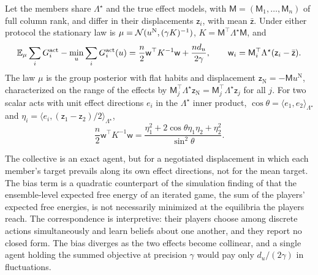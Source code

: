 \begin{proposition}\label{prop:obj-cost}
Let the members share $\Lambda^\star$ and the true effect models, with $\mathsf M=(\mathsf M_1,\dots,\mathsf M_n)$ of full column rank, and differ in their displacements $\mathsf z_i$, with mean $\bar{\mathsf z}$. Under either protocol the stationary law is $\mu=\mathcal{N}(u^{\mathrm N},(\gamma K)^{-1})$, $K=\mathsf M^\top\Lambda^\star\mathsf M$, and
\begin{equation}\label{eq:obj-cost}
\mathbb{E}_\mu\sum_iG^{\mathrm{act}}_i-\min_u\sum_iG^{\mathrm{act}}_i(u)=\frac n2\mathsf w^\top K^{-1}\mathsf w+\frac{nd_u}{2\gamma},\qquad\mathsf w_i=\mathsf M_i^\top\Lambda^\star(\mathsf z_i-\bar{\mathsf z}).
\end{equation}
The law $\mu$ is the group posterior with flat habits and displacement $\mathsf z_{\mathrm N}=-\mathsf Mu^{\mathrm N}$, characterized on the range of the effects by $\mathsf M_j^\top\Lambda^\star\mathsf z_{\mathrm N}=\mathsf M_j^\top\Lambda^\star\mathsf z_j$ for all $j$. For two scalar acts with unit effect directions $e_i$ in the $\Lambda^\star$ inner product, $\cos\theta=\langle e_1,e_2\rangle_{\Lambda^\star}$ and $\eta_i=\langle e_i,(\mathsf z_1-\mathsf z_2)/2\rangle_{\Lambda^\star}$,
\begin{equation}\label{eq:obj-cost-two}
\frac n2\mathsf w^\top K^{-1}\mathsf w=\frac{\eta_1^2+2\cos\theta\eta_1\eta_2+\eta_2^2}{\sin^2\theta}.
\end{equation}
\end{proposition}

The collective is an exact agent, but for a negotiated displacement in which each member's target prevails along its own effect directions, not for the mean target. The bias term is a quadratic counterpart of the simulation finding of \citet{ruizserra2025factorised} that the ensemble-level expected free energy of an iterated game, the sum of the players' expected free energies, is not necessarily minimized at the equilibria the players reach. The correspondence is interpretive: their players choose among discrete actions simultaneously and learn beliefs about one another, and they report no closed form. The bias diverges as the two effects become collinear, and a single agent holding the summed objective at precision $\gamma$ would pay only $d_u/(2\gamma)$ in fluctuations.

